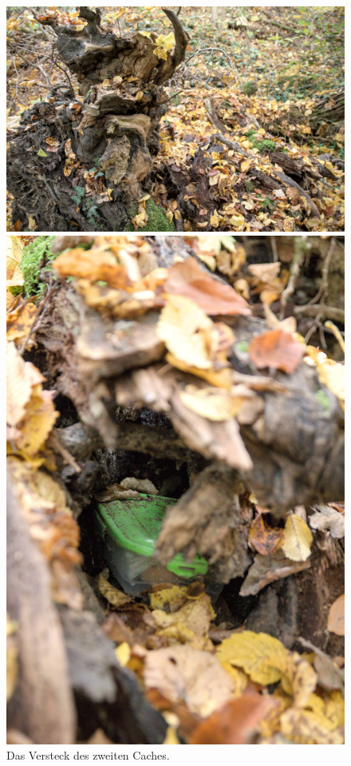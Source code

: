 \begin{figure}[h]
    \centering
    \begin{minipage}{.6\textwidth}
        \centering
        \includegraphics[width=\linewidth]{figures/geocaching/second/IMG_3109.jpg}
    \end{minipage}%
    \begin{minipage}{.4\textwidth}
        \centering
        \includegraphics[width=.7\linewidth]{figures/geocaching/second/IMG_3112.jpg}
    \end{minipage}
    \caption{Das Versteck des zweiten Caches.}
    \label{second-cache-versteck}
\end{figure}

